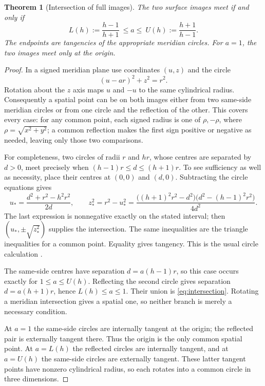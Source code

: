 \documentclass[11pt,a4paper]{article}
\newtheorem{theorem}{Theorem}[section]
\theoremstyle{definition}
\theoremstyle{remark}
\begin{document}
\begin{theorem}[Intersection of full images]
\label{thm:intersection}
The two surface images meet if and only if
\begin{equation}
 L(h):=\frac{h-1}{h+1}\ \leq a\leq\
 U(h):=\frac{h+1}{h-1}.
 \label{eq:intersection}
\end{equation}
The endpoints are tangencies of the appropriate meridian circles.
For $a=1$, the two images meet only at the origin.
\end{theorem}
\begin{proof}
In a signed meridian plane use coordinates $(u,z)$ and the circle
\[
 (u-ar)^2+z^2=r^2.
\]
Rotation about the $z$ axis maps $u$ and $-u$ to the same cylindrical
radius. Consequently a spatial point can be on both images either
from two same-side meridian circles or from one circle and the
reflection of the other. This covers every case: for any common point,
each signed radius is one of $\rho,-\rho$, where
$\rho=\sqrt{x^2+y^2}$; a common reflection makes the first sign
positive or negative as needed, leaving only those two comparisons.

For completeness, two circles of radii $r$ and $hr$, whose centres
are separated by $d>0$, meet precisely when
$(h-1)r\leq d\leq(h+1)r$. To see sufficiency as well as necessity,
place their centres at $(0,0)$ and $(d,0)$. Subtracting the circle
equations gives
\[
 u_*=\frac{d^2+r^2-h^2r^2}{2d},\qquad
 z_*^2=r^2-u_*^2
 =\frac{\bigl((h+1)^2r^2-d^2\bigr)
             \bigl(d^2-(h-1)^2r^2\bigr)}{4d^2}.
\]
The last expression is nonnegative exactly on the stated interval;
then $(u_*,\pm\sqrt{z_*^2})$ supplies the intersection. The same
inequalities are the triangle inequalities for a common point.
Equality gives tangency. This is the usual circle calculation
\cite{weissteinCircles}.

The same-side centres have separation $d=a(h-1)r$, so this case
occurs exactly for $1\leq a\leq U(h)$. Reflecting the second
circle gives separation $d=a(h+1)r$, hence
$L(h)\leq a\leq1$. Their union is \eqref{eq:intersection}.
Rotating a meridian intersection gives a spatial one, so neither
branch is merely a necessary condition.

At $a=1$ the same-side circles are internally tangent at the origin;
the reflected pair is externally tangent there. Thus the origin
is the only common spatial point. At $a=L(h)$ the reflected
circles are internally tangent, and at $a=U(h)$ the same-side
circles are externally tangent. These latter tangent points have
nonzero cylindrical radius, so each rotates into a common circle
in three dimensions.
\end{proof}
\end{document}
